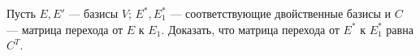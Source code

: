 \documentclass[../main.tex]{subfiles}
\begin{document}
\begin{exercise}
  Пусть $E, E'$ --- базисы $V$; $E^{*}, E_1^{*}$ --- соответствующие двойственные базисы и $C$ --- матрица перехода от $E$ к $E_1$. Доказать, что матрица перехода от $E^{*}$ к $E_1^{*}$ равна $C^T$.
\end{exercise}
\end{document}
